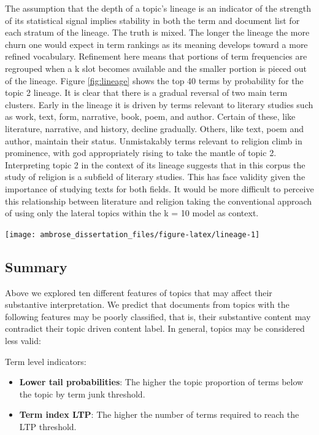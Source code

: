 \documentclass[]{book}
\providecommand{\tightlist}{%
  \setlength{\itemsep}{0pt}\setlength{\parskip}{0pt}}
\theoremstyle{definition}
\theoremstyle{definition}
\theoremstyle{definition}
\theoremstyle{remark}
\begin{document}
The assumption that the depth of a topic's lineage is an indicator of
the strength of its statistical signal implies stability in both the
term and document list for each stratum of the lineage. The truth is
mixed. The longer the lineage the more churn one would expect in term
rankings as its meaning develops toward a more refined vocabulary.
Refinement here means that portions of term frequencies are regrouped
when a k slot becomes available and the smaller portion is pieced out of
the lineage. Figure \ref{fig:lineage} shows the top 40 terms by
probability for the topic 2 lineage. It is clear that there is a gradual
reversal of two main term clusters. Early in the lineage it is driven by
terms relevant to literary studies such as work, text, form, narrative,
book, poem, and author. Certain of these, like literature, narrative,
and history, decline gradually. Others, like text, poem and author,
maintain their status. Unmistakably terms relevant to religion climb in
prominence, with god appropriately rising to take the mantle of topic 2.
Interpreting topic 2 in the context of its lineage suggests that in this
corpus the study of religion is a subfield of literary studies. This has
face validity given the importance of studying texts for both fields. It
would be more difficult to perceive this relationship between literature
and religion taking the conventional approach of using only the lateral
topics within the k = 10 model as context.

\begin{center}\texttt{[image: ambrose\_dissertation\_files/figure-latex/lineage-1]} \end{center}

\hypertarget{summary}{%
\subsection{Summary}\label{summary}}

Above we explored ten different features of topics that may affect their
substantive interpretation. We predict that documents from topics with
the following features may be poorly classified, that is, their
substantive content may contradict their topic driven content label. In
general, topics may be considered less valid:

Term level indicators:

\begin{itemize}
\tightlist
\item
  \textbf{Lower tail probabilities}: The higher the topic proportion of
  terms below the topic by term junk threshold.
\item
  \textbf{Term index LTP}: The higher the number of terms required to
  reach the LTP threshold.
\end{itemize}
\end{document}

